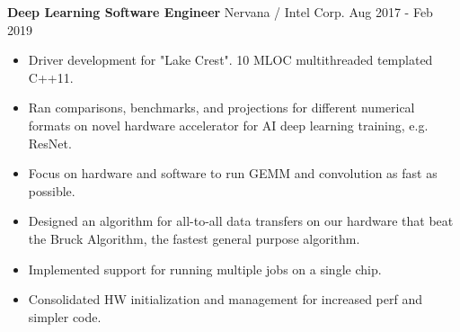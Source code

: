 \textbf{Deep Learning Software Engineer}  Nervana / Intel Corp. \hfill Aug 2017 - Feb 2019

\begin{itemize} \itemsep -2pt

\item Driver development for "Lake Crest". 10 MLOC multithreaded templated C++11.

\item Ran comparisons, benchmarks, and projections for different numerical formats on novel hardware accelerator
      for AI deep learning training, e.g. ResNet.

\item Focus on hardware and software to run GEMM and convolution as fast as possible.

\item Designed an algorithm for all-to-all data transfers on our hardware that beat the Bruck Algorithm,
      the fastest general purpose algorithm.

\item Implemented support for running multiple jobs on a single chip.

\item Consolidated HW initialization and management for increased perf and simpler code.

\end{itemize}
